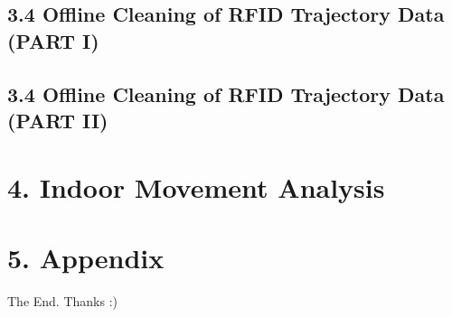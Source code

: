\documentclass{beamer}
\begin{document}
% 
% 

\subsection{3.4 Offline Cleaning of RFID Trajectory Data (PART I)} %

% 
% 

\subsection{3.4 Offline Cleaning of RFID Trajectory Data (PART II)} %




\section{4. Indoor Movement Analysis} %

\section{5. Appendix} %

%



\begin{frame}
\Huge{\centerline{The End. Thanks :)}}
\end{frame}

\end{document}

